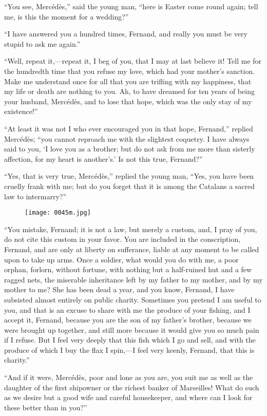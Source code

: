 “You see, Mercédès,” said the young man, “here is Easter come round
again; tell me, is this the moment for a wedding?”

“I have answered you a hundred times, Fernand, and really you must be
very stupid to ask me again.”

“Well, repeat it,—repeat it, I beg of you, that I may at last believe
it! Tell me for the hundredth time that you refuse my love, which had
your mother’s sanction. Make me understand once for all that you are
trifling with my happiness, that my life or death are nothing to you.
Ah, to have dreamed for ten years of being your husband, Mercédès, and
to lose that hope, which was the only stay of my existence!”

“At least it was not I who ever encouraged you in that hope, Fernand,”
replied Mercédès; “you cannot reproach me with the slightest coquetry.
I have always said to you, ‘I love you as a brother; but do not ask
from me more than sisterly affection, for my heart is another’s.’ Is
not this true, Fernand?”

“Yes, that is very true, Mercédès,” replied the young man, “Yes, you
have been cruelly frank with me; but do you forget that it is among the
Catalans a sacred law to intermarry?”

\begin{figure}[h]
\texttt{[image: 0045m.jpg]}
\end{figure}

“You mistake, Fernand; it is not a law, but merely a custom, and, I
pray of you, do not cite this custom in your favor. You are included in
the conscription, Fernand, and are only at liberty on sufferance,
liable at any moment to be called upon to take up arms. Once a soldier,
what would you do with me, a poor orphan, forlorn, without fortune,
with nothing but a half-ruined hut and a few ragged nets, the miserable
inheritance left by my father to my mother, and by my mother to me? She
has been dead a year, and you know, Fernand, I have subsisted almost
entirely on public charity. Sometimes you pretend I am useful to you,
and that is an excuse to share with me the produce of your fishing, and
I accept it, Fernand, because you are the son of my father’s brother,
because we were brought up together, and still more because it would
give you so much pain if I refuse. But I feel very deeply that this
fish which I go and sell, and with the produce of which I buy the flax
I spin,—I feel very keenly, Fernand, that this is charity.”

“And if it were, Mercédès, poor and lone as you are, you suit me as
well as the daughter of the first shipowner or the richest banker of
Marseilles! What do such as we desire but a good wife and careful
housekeeper, and where can I look for these better than in you?”

